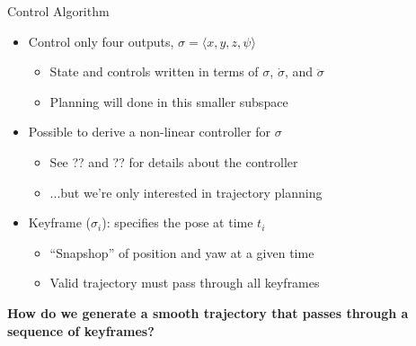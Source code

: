\documentclass[onlymath]{beamer}
\begin{document}
\begin{frame}{Control Algorithm}
\begin{itemize}
\item Control only four outputs, $\sigma = \langle x, y, z, \psi \rangle$
    \begin{itemize}
    \item State and controls written in terms of $\sigma$, $\dot{\sigma}$, and
          $\ddot{\sigma}$
    \item Planning will done in this smaller subspace
    \end{itemize}
\item Possible to derive a non-linear controller for $\sigma$
    \begin{itemize}
    \item See ?? and ?? for details about the controller
    \item ...but we're only interested in trajectory planning
    \end{itemize}
\item Keyframe ($\sigma_i$): specifies the pose at time $t_i$
    \begin{itemize}
    \item ``Snapshop'' of position and yaw at a given time
    \item Valid trajectory must pass through all keyframes
    \end{itemize}
\end{itemize}
\begin{center}
    \textbf{How do we generate a smooth trajectory that passes through a
    sequence of keyframes?}
\end{center}
\end{frame}
\end{document}
